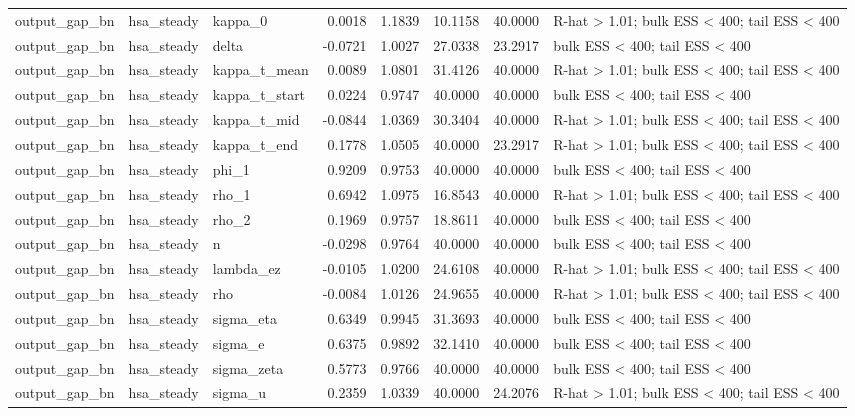 \begin{tabular}{lllrrrrl}
output\_gap\_bn & hsa\_steady & kappa\_0 & 0.0018 & 1.1839 & 10.1158 & 40.0000 & R-hat > 1.01; bulk ESS < 400; tail ESS < 400 \\
output\_gap\_bn & hsa\_steady & delta & -0.0721 & 1.0027 & 27.0338 & 23.2917 & bulk ESS < 400; tail ESS < 400 \\
output\_gap\_bn & hsa\_steady & kappa\_t\_mean & 0.0089 & 1.0801 & 31.4126 & 40.0000 & R-hat > 1.01; bulk ESS < 400; tail ESS < 400 \\
output\_gap\_bn & hsa\_steady & kappa\_t\_start & 0.0224 & 0.9747 & 40.0000 & 40.0000 & bulk ESS < 400; tail ESS < 400 \\
output\_gap\_bn & hsa\_steady & kappa\_t\_mid & -0.0844 & 1.0369 & 30.3404 & 40.0000 & R-hat > 1.01; bulk ESS < 400; tail ESS < 400 \\
output\_gap\_bn & hsa\_steady & kappa\_t\_end & 0.1778 & 1.0505 & 40.0000 & 23.2917 & R-hat > 1.01; bulk ESS < 400; tail ESS < 400 \\
output\_gap\_bn & hsa\_steady & phi\_1 & 0.9209 & 0.9753 & 40.0000 & 40.0000 & bulk ESS < 400; tail ESS < 400 \\
output\_gap\_bn & hsa\_steady & rho\_1 & 0.6942 & 1.0975 & 16.8543 & 40.0000 & R-hat > 1.01; bulk ESS < 400; tail ESS < 400 \\
output\_gap\_bn & hsa\_steady & rho\_2 & 0.1969 & 0.9757 & 18.8611 & 40.0000 & bulk ESS < 400; tail ESS < 400 \\
output\_gap\_bn & hsa\_steady & n & -0.0298 & 0.9764 & 40.0000 & 40.0000 & bulk ESS < 400; tail ESS < 400 \\
output\_gap\_bn & hsa\_steady & lambda\_ez & -0.0105 & 1.0200 & 24.6108 & 40.0000 & R-hat > 1.01; bulk ESS < 400; tail ESS < 400 \\
output\_gap\_bn & hsa\_steady & rho & -0.0084 & 1.0126 & 24.9655 & 40.0000 & R-hat > 1.01; bulk ESS < 400; tail ESS < 400 \\
output\_gap\_bn & hsa\_steady & sigma\_eta & 0.6349 & 0.9945 & 31.3693 & 40.0000 & bulk ESS < 400; tail ESS < 400 \\
output\_gap\_bn & hsa\_steady & sigma\_e & 0.6375 & 0.9892 & 32.1410 & 40.0000 & bulk ESS < 400; tail ESS < 400 \\
output\_gap\_bn & hsa\_steady & sigma\_zeta & 0.5773 & 0.9766 & 40.0000 & 40.0000 & bulk ESS < 400; tail ESS < 400 \\
output\_gap\_bn & hsa\_steady & sigma\_u & 0.2359 & 1.0339 & 40.0000 & 24.2076 & R-hat > 1.01; bulk ESS < 400; tail ESS < 400 \\

\end{tabular}
